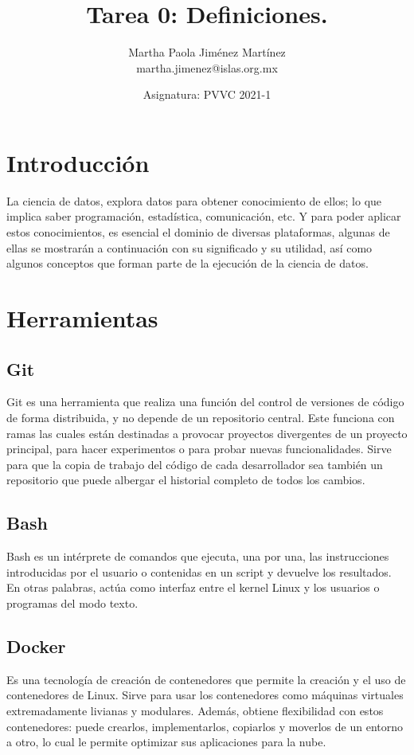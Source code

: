 \documentclass[12pt,letterpaper]{article}
\begin{document}
\title{\textbf{Tarea 0: Definiciones.}} \author{Martha Paola Jiménez
Martínez \\
\small{martha.jimenez@islas.org.mx}}
\date{ \small{Asignatura: PVVC 2021-1}
} 
\maketitle


\section*{Introducción}
La ciencia de datos, explora datos para obtener conocimiento de ellos; lo que implica saber programación, estadística, comunicación, etc. Y para poder aplicar estos conocimientos, es esencial el dominio de diversas plataformas, algunas de ellas se mostrarán a continuación con su significado y su utilidad, así como algunos conceptos que forman parte de la ejecución de la ciencia de datos.

\section*{Herramientas}
\subsection*{Git}
Git es una herramienta que realiza una función del control de versiones de
código de forma distribuida, y no depende de un repositorio central. Este
funciona con ramas las cuales están destinadas a provocar proyectos divergentes
de un proyecto principal, para hacer experimentos o para probar nuevas
funcionalidades.
\citep{rubio_2020}
Sirve para que la copia de trabajo del código de cada desarrollador sea también
un repositorio que puede albergar el historial completo de todos los cambios.
\citep{bitbucket_git}

\subsection*{Bash}
Bash es un intérprete de comandos que ejecuta, una por una, las instrucciones
introducidas por el usuario o contenidas en un script y devuelve los resultados.
En otras palabras, actúa como interfaz entre el kernel Linux y los usuarios o
programas del modo texto.
\citep{canepa_2018}

\subsection*{Docker}
Es una tecnología de creación de contenedores que permite la creación y el uso
de contenedores de Linux. Sirve para usar los contenedores como máquinas
virtuales extremadamente livianas y modulares. Además, obtiene flexibilidad con
estos contenedores: puede crearlos, implementarlos, copiarlos y moverlos de un
entorno a otro, lo cual le permite optimizar sus aplicaciones para la nube.
\citep{redhat_docker}
\end{document}
